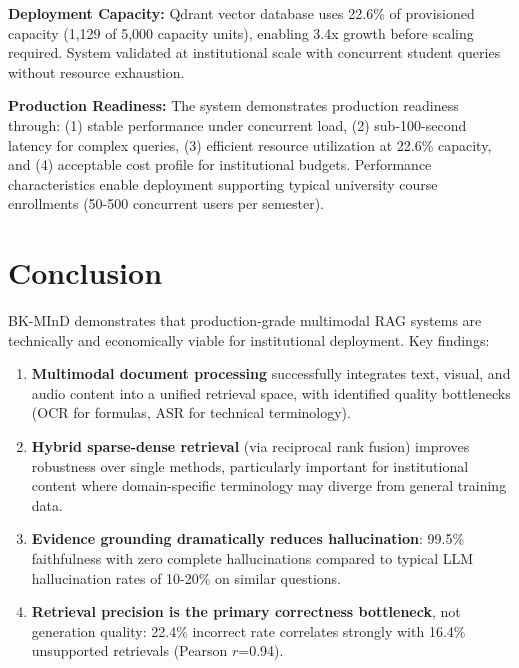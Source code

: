 \documentclass[11pt,a4paper,twocolumn]{article}
\begin{document}
\textbf{Deployment Capacity:} Qdrant vector database uses 22.6\% of provisioned capacity (1,129 of 5,000 capacity units), enabling 3.4x growth before scaling required. System validated at institutional scale with concurrent student queries without resource exhaustion.

\textbf{Production Readiness:} The system demonstrates production readiness through: (1) stable performance under concurrent load, (2) sub-100-second latency for complex queries, (3) efficient resource utilization at 22.6\% capacity, and (4) acceptable cost profile for institutional budgets. Performance characteristics enable deployment supporting typical university course enrollments (50-500 concurrent users per semester).

\section{Conclusion}

BK-MInD demonstrates that production-grade multimodal RAG systems are technically and economically viable for institutional deployment. Key findings:

\begin{enumerate}
    \item \textbf{Multimodal document processing} successfully integrates text, visual, and audio content into a unified retrieval space, with identified quality bottlenecks (OCR for formulas, ASR for technical terminology).

    \item \textbf{Hybrid sparse-dense retrieval} (via reciprocal rank fusion) improves robustness over single methods, particularly important for institutional content where domain-specific terminology may diverge from general training data.

    \item \textbf{Evidence grounding dramatically reduces hallucination}: 99.5\% faithfulness with zero complete hallucinations compared to typical LLM hallucination rates of 10-20\% on similar questions.

    \item \textbf{Retrieval precision is the primary correctness bottleneck}, not generation quality: 22.4\% incorrect rate correlates strongly with 16.4\% unsupported retrievals (Pearson $r$=0.94).
\end{enumerate}
\end{document}
